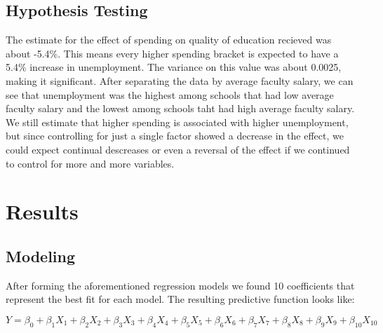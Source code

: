 \documentclass{article}\usepackage[]{graphicx}\usepackage[]{color}
\begin{document}
\subsection{Hypothesis Testing}
The estimate for the effect of spending on quality of education recieved was about -5.4\%. This means every higher spending bracket is expected to have a 5.4\% increase in unemployment. The variance on this value was about 0.0025, making it significant. After separating the data by average faculty salary, we can see that unemployment was the highest among schools that had low average faculty salary and the lowest among schools taht had high average faculty salary. We still estimate that higher spending is associated with higher unemployment, but since controlling for just a single factor showed a decrease in the effect, we could expect continual descreases or even a reversal of the effect if we continued to control for more and more variables.
\maketitle
\section{Results}

\subsection{Modeling}
After forming the aforementioned regression models we found 10 coefficients that represent the best fit for each model. The resulting predictive function looks like:

\begin{equation}
Y = \beta_0 + \beta_1 X_1 + \beta_2 X_2 + \beta_3 X_3 + \beta_4 X_4 + \beta_5 X_5 + \beta_6 X_6 + \beta_7 X_7 + \beta_8 X_8 + \beta_9 X_9 + \beta_{10} X_{10}
\end{equation}
\end{document}
